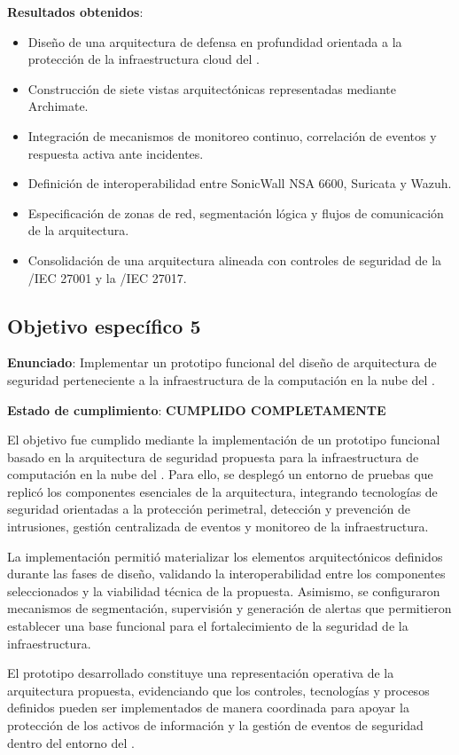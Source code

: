 \textbf{Resultados obtenidos}:
\begin{itemize}
	\item Diseño de una arquitectura de defensa en profundidad orientada a la protección de la infraestructura cloud del \GRID.
	\item Construcción de siete vistas arquitectónicas representadas mediante Archimate.
	\item Integración de mecanismos de monitoreo continuo, correlación de eventos y respuesta activa ante incidentes.
	\item Definición de interoperabilidad entre SonicWall NSA 6600, Suricata y Wazuh.
	\item Especificación de zonas de red, segmentación lógica y flujos de comunicación de la arquitectura.
	\item Consolidación de una arquitectura alineada con controles de seguridad de la \ISO/IEC 27001 y la \ISO/IEC 27017.
\end{itemize}

\subsection{Objetivo específico 5}
\noindent

\textbf{Enunciado}: Implementar un prototipo funcional del diseño de arquitectura de seguridad perteneciente a la infraestructura de la 
computación en la nube del \GRID.

\textbf{Estado de cumplimiento}: \textbf{CUMPLIDO COMPLETAMENTE}

El objetivo fue cumplido mediante la implementación de un prototipo funcional basado en la arquitectura de seguridad 
propuesta para la infraestructura de computación en la nube del \GRID. Para ello, se desplegó un entorno de pruebas que 
replicó los componentes esenciales de la arquitectura, integrando tecnologías de seguridad orientadas a la protección 
perimetral, detección y prevención de intrusiones, gestión centralizada de eventos y monitoreo de la infraestructura.

La implementación permitió materializar los elementos arquitectónicos definidos durante las fases de diseño, validando la 
interoperabilidad entre los componentes seleccionados y la viabilidad técnica de la propuesta. Asimismo, se configuraron 
mecanismos de segmentación, supervisión y generación de alertas que permitieron establecer una base funcional para el 
fortalecimiento de la seguridad de la infraestructura.

El prototipo desarrollado constituye una representación operativa de la arquitectura propuesta, evidenciando que los 
controles, tecnologías y procesos definidos pueden ser implementados de manera coordinada para apoyar la protección de los 
activos de información y la gestión de eventos de seguridad dentro del entorno del \GRID.


